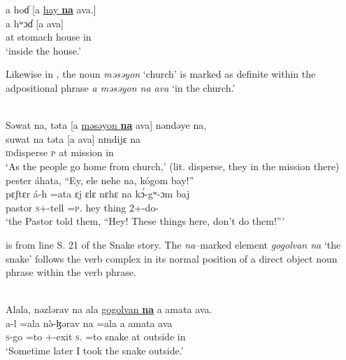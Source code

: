       \medskip
a  hoɗ  [a  \underline{hay  \textbf{na}}  ava.]\\      
\gll a     hʷɔɗ      [a               ava]\\
     at   stomach {\GEN} house   {\PSP}    in\\
\glt  ‘inside the house.'
\z

Likewise in , the noun \textit{məsəyon} ‘church’ is marked as definite within the adpositional phrase \textit{a məsəyon na ava} ‘in the church.’ 

\newpage 
\ea \label{ex:11:43}
\\
Səwat  na,  təta  [a  \underline{məsəyon  \textbf{na}}  ava]  nəndəye  na,\\  
\gll  suwat   na   təta   [a        ava]     nɪndijɛ  na  \\     
      \textsc{id}disperse  {\PSP}  \textsc{p}      at  mission  {\PSP}    in  {\DEM}  {\PSP}  \\    
      \glt ‘As the people go home from church,' (lit. disperse, they in the mission there)\\
 
 
      \medskip
pester  áhata,   “Ey, ele  nehe  na,  kógom  bay!” \\      
\gll pɛʃtɛr  á-h    =ata   ɛj ɛlɛ nɛhɛ na   k\'{ɔ}-gʷ-ɔm    baj\\
     pastor  \textsc{s}+{\IFV}-tell  =\textsc{p}.{\IO}   hey    thing  {\DEM}  {\PSP}  2+{\IFV}-do-{\twoP}    {\NEG}\\
\glt  ‘the Pastor told them, “Hey! These things here, don’t do them!”’
\z

 is from line S. 21 of the Snake story. The \textit{na}–marked element \textit{gogolvan  na} ‘the snake’ follows the verb complex in its normal position of a direct object noun phrase within the verb phrase. 

\ea \label{ex:11:44}
\\
Alala,  nəzlərav  na  ala  \underline{gogolvan  \textbf{na}}  a  amata  ava.\\
\gll  a-l  =ala  n\`ə-ɮərav  na =ala        a  amata   ava\\
      \textsc{s}-go =to  {\oneS}+{\PFV}-exit   \textsc{s}.{\DO}  =to  snake        {\PSP}    at   outside  in\\
\glt  ‘Sometime later I took the snake outside.’
\z

